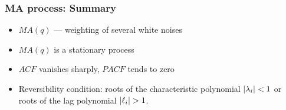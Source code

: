\begin{frame}
\frametitle{MA process: Summary}
	
	\begin{itemize}[<+->]
		\item $MA(q)$ — weighting of several white noises
		\item $MA(q)$ is a stationary process
		\item $ACF$ vanishes sharply, $PACF$ tends to zero
 		\item Reversibility condition: roots of the characteristic polynomial $\abs{\lambda_i} < 1$ or 
		roots of the lag polynomial $\abs{\ell_i} > 1$.
	\end{itemize}
\end{frame}
